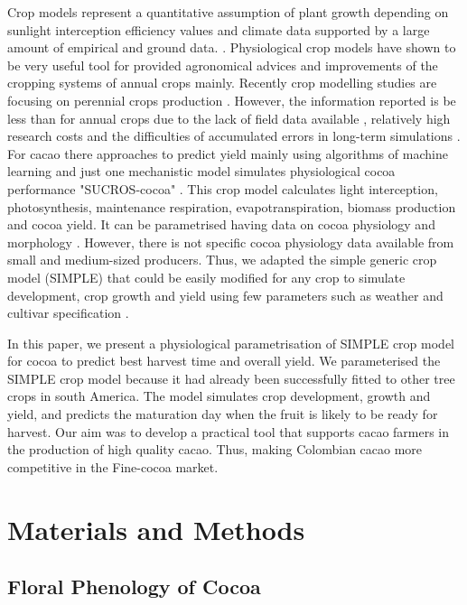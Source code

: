 \documentclass[gene,journal,article,submit,moreauthors,pdftex]{Definitions/mdpi}
\begin{document}
Crop models represent a quantitative assumption of plant growth depending on sunlight interception efficiency values and climate data supported by a large amount of empirical and ground data. \citep{Reynolds2018}. Physiological crop models have shown to be very useful tool for provided agronomical advices and improvements of the cropping systems of annual crops mainly. Recently crop modelling studies are focusing on  perennial crops  production \citep{zuidema2005, Zao2019simple, Bai2020, Romero2021}. However, the information reported  is be less than for annual crops due to the lack of field data available , relatively high research costs and the difficulties of accumulated errors in long-term simulations \citep{zuidema2005}. For cacao there  approaches  to predict yield mainly  using algorithms of machine learning \citep{lamos2020} and just one mechanistic model simulates physiological cocoa performance  "SUCROS-cocoa" \citep{zuidema2005}. This crop model calculates light interception, photosynthesis, maintenance respiration,
evapotranspiration, biomass production and cocoa yield. It can be parametrised having data on cocoa physiology and morphology \citep{zuidema2005}. However,  there is not specific cocoa physiology data available from small and medium-sized producers. Thus, we adapted the simple generic crop model (SIMPLE) that could be easily modified for any crop to simulate development, crop growth and yield using few parameters such as weather and cultivar specification \citep{Zao2019simple}.

In this paper, we present a physiological parametrisation of SIMPLE crop model for cocoa to predict best harvest time and overall yield. {\color{red} We parameterised the SIMPLE crop model \citep{Zao2019simple} because it had already been successfully fitted to other tree crops in south America. The model simulates crop development, growth and yield, and predicts the maturation day when the fruit is likely to be ready for harvest. Our aim was to develop a practical tool that supports cacao farmers in the production of high quality cacao. Thus, making Colombian cacao more competitive in the Fine-cocoa market.}


\section{Materials and Methods}

\subsection{Floral Phenology of Cocoa}
\end{document}
